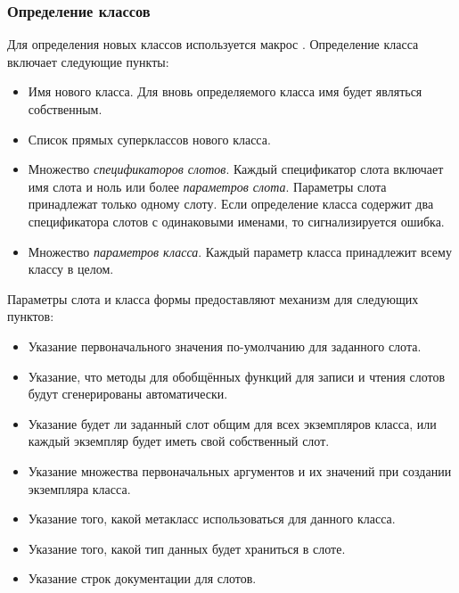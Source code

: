 \subsubsection{Определение классов}

Для определения новых классов используется макрос .
Определение класса включает следующие пункты:
\begin{itemize}
\item Имя нового класса. Для вновь определяемого класса имя будет являться
  собственным.

\item Список прямых суперклассов нового класса.

\item Множество \emph{спецификаторов слотов}. Каждый спецификатор слота включает
  имя слота и ноль или более \emph{параметров слота}. Параметры слота
  принадлежат только одному слоту. Если определение класса содержит два
  спецификатора слотов с одинаковыми именами, то сигнализируется ошибка.

\item Множество \emph{параметров класса}. Каждый параметр класса принадлежит
  всему классу в целом.
\end{itemize}

Параметры слота и класса формы  предоставляют механизм для
следующих пунктов:
\begin{itemize}
\item Указание первоначального значения по-умолчанию для заданного слота.

\item Указание, что методы для обобщённых функций для записи и чтения слотов
  будут сгенерированы автоматически.

\item Указание будет ли заданный слот общим для всех экземпляров класса, или
  каждый экземпляр будет иметь свой собственный слот.

\item Указание множества первоначальных аргументов и их значений при создании
  экземпляра класса.

\item Указание того, какой метакласс использоваться для данного класса.

\item Указание того, какой тип данных будет храниться в слоте.

\item Указание строк документации для слотов.
\end{itemize}

